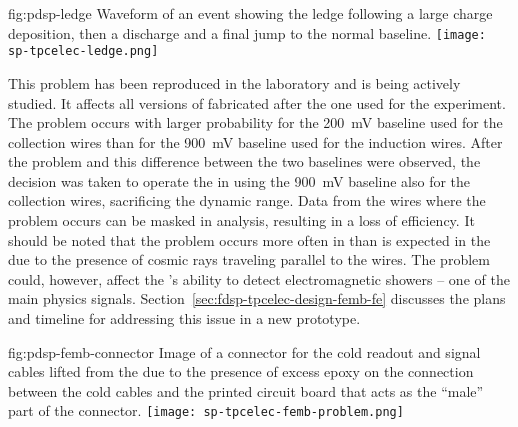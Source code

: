 \begin{dunefigure}
{fig:pdsp-ledge}
{Waveform of an event showing the ledge following a large charge 
deposition, then a discharge and a final jump to the normal baseline.}
\texttt{[image: sp-tpcelec-ledge.png]}
\end{dunefigure}

This problem has been reproduced in the laboratory and is being actively 
studied. It affects all versions of  fabricated after 
the one used for the  experiment. The problem occurs 
with larger probability for the \SI{200}{mV} baseline used for the collection
wires than for the \SI{900}{mV} baseline used for the induction wires.
After the problem and this difference between the two baselines were 
observed, the decision was taken to operate the  in  
using the \SI{900}{mV} baseline also for the collection wires, sacrificing
the dynamic range. Data from the wires where the problem occurs can
be masked in analysis, resulting in a loss of efficiency. It should be
noted that the problem occurs more often in  %
than is expected in the    due to the presence of cosmic rays traveling parallel
to the  wires. %
The problem %
could, however, affect the 's ability to detect
electromagnetic showers -- one of the main physics signals.
Section~\ref{sec:fdsp-tpcelec-design-femb-fe} discusses the plans and timeline for addressing this issue in a new  prototype.

\begin{dunefigure}
{fig:pdsp-femb-connector}
{Image of a connector for the cold readout and signal cables lifted from
the  due to the presence of excess epoxy on the 
connection between the cold cables and the printed circuit board
that acts as the ``male'' part of the connector.}
\texttt{[image: sp-tpcelec-femb-problem.png]}
\end{dunefigure}

